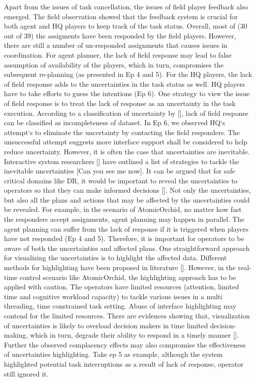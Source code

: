 Apart from the issues of task cancellation, the issues of field player feedback also emerged. The field observation showed that the feedback system is crucial for both agent and HQ players to keep track of the task status. Overall, most of (30 out of 39) the assigments have been responded by the field players. However, there are still a number of un-responded assignments that causes issues in coordination. For agent planner, the lack of field response may lead to false assumption of availability of the players, which in turn, compromises the subsequent re-planning (as presented in Ep 4 and 5). For the HQ players, the lack of field response adds to the uncertainties in the task status as well. HQ players have to take efforts to guess the intentions (Ep 6). One strategy to view the issue of field response is to treat the lack of response as an uncertainty in the task execution. According to a classification of uncertainty by [], lack of field response can be classified as incompleteness of dataset. In Ep 6, we observed HQ`s attempt`s to eliminate the uncertainty by contacting the field responders. The unsuccessful attempt suggests more interface support shall be considered to help reduce uncertainty. However, it is often the case that uncertainties are inevitable. Interactive system researchers [] have outlined a list of strategies to tackle the inevitable uncertainties [Can you see me now]. It can be argued that for safe critical domains like DR, it would be important to reveal the uncertainties to operators so that they can make informed decisions []. Not only the uncertainties, but also all the plans and actions that may be affected by the uncertainties could be revealed. For example, in the scenario of AtomicOrchid, no matter how fast the responders accept assignments, agent planning may happen in parallel. The agent planning can suffer from the lack of response if it is triggered when players have not responded (Ep 4 and 5).  Therefore, it is important for operators to be aware of both the uncertainties and affected plans. One straightforward approach for visualizing the uncertainties is to highlight the affected data. Different methods for highlighting have been proposed in literature []. However, in the real-time control scenario like AtomicOrchid, the highlighting approach has to be applied with caution.  The operators have limited resources (attention, limited time and cognitive workload capacity) to tackle various issues in a multi threading, time constrained task setting. Abuse of interface highlighting may contend for the limited resources. There are evidences showing that, visualization of uncertainties is likely to overload decision makers in time limited decision-making, which in turn, degrade their ability to respond in a timely manner []. Further the observed complacency effects may also compromise the effectiveness of uncertainties highlighting. Take ep 5 as example, although the system highlighted potential task interruptions as a result of lack of response, operator still ignored it. \\

